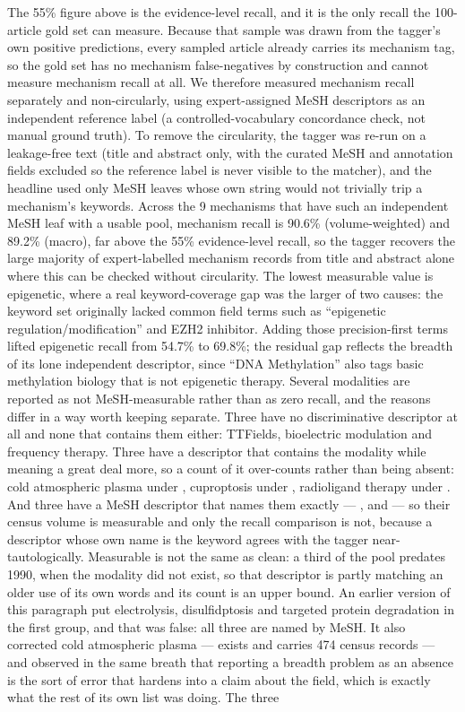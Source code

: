 \documentclass[11pt,twoside,openright]{report}
\begin{document}
The 55\% figure above is the evidence-level recall, and it is the only recall the 100-article gold set can measure. Because that sample was drawn from the tagger's own positive predictions, every sampled article already carries its mechanism tag, so the gold set has no mechanism false-negatives by construction and cannot measure mechanism recall at all. We therefore measured mechanism recall separately and non-circularly, using expert-assigned MeSH descriptors as an independent reference label (a controlled-vocabulary concordance check, not manual ground truth). To remove the circularity, the tagger was re-run on a leakage-free text (title and abstract only, with the curated MeSH and annotation fields excluded so the reference label is never visible to the matcher), and the headline used only MeSH leaves whose own string would not trivially trip a mechanism's keywords. Across the 9 mechanisms that have such an independent MeSH leaf with a usable pool, mechanism recall is 90.6\% (volume-weighted) and 89.2\% (macro), far above the 55\% evidence-level recall, so the tagger recovers the large majority of expert-labelled mechanism records from title and abstract alone where this can be checked without circularity. The lowest measurable value is epigenetic, where a real keyword-coverage gap was the larger of two causes: the keyword set originally lacked common field terms such as ``epigenetic regulation/modification'' and EZH2 inhibitor. Adding those precision-first terms lifted epigenetic recall from 54.7\% to 69.8\%; the residual gap reflects the breadth of its lone independent descriptor, since ``DNA Methylation'' also tags basic methylation biology that is not epigenetic therapy. Several modalities are reported as not MeSH-measurable rather than as zero recall, and the reasons differ in a way worth keeping separate. Three have no discriminative descriptor at all and none that contains them either: TTFields, bioelectric modulation and frequency therapy. Three have a descriptor that contains the modality while meaning a great deal more, so a count of it over-counts rather than being absent: cold atmospheric plasma under , cuproptosis under , radioligand therapy under . And three have a MeSH descriptor that names them exactly --- ,  and  --- so their census volume is measurable and only the recall comparison is not, because a descriptor whose own name is the keyword agrees with the tagger near-tautologically. Measurable is not the same as clean: a third of the  pool predates 1990, when the modality did not exist, so that descriptor is partly matching an older use of its own words and its count is an upper bound. An earlier version of this paragraph put electrolysis, disulfidptosis and targeted protein degradation in the first group, and that was false: all three are named by MeSH. It also corrected cold atmospheric plasma ---  exists and carries 474 census records --- and observed in the same breath that reporting a breadth problem as an absence is the sort of error that hardens into a claim about the field, which is exactly what the rest of its own list was doing. The three 
\end{document}
